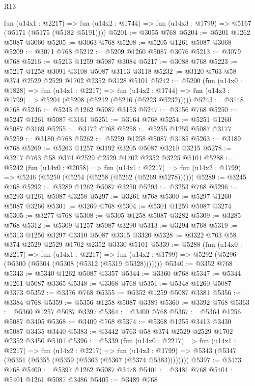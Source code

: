 \begin{lexlean}{R13}
\begin{coremodule}
    fun (u14x1 : @2217) =>
    fun (u14x2 : @1744) => fun (u14x3 : @1799) => @5167 (@5171 (@5175 (@5182 @5191))))
@5201 := @3055 @768
@5204 := @5201 @1262 @5087 @3060
@5205 := @3063 @768
@5208 := @5205 @1261 @5087 @3068
@5209 := @3071 @768
@5212 := @5209 @1260 @5087 @3076
@5213 := @3079 @768
@5216 := @5213 @1259 @5087 @3084
@5217 := @3088 @768
@5223 := @5217 @1258 @3091 @3108 @5087 @3113 @3118
@5232 := @3120 @763 @58 @374 @2529 @2529 @1702 @2352 @3128 @5101
@5242 := @5200
    (fun (u14x0 : @1828) =>
    fun (u14x1 : @2217) =>
    fun (u14x2 : @1744) => fun (u14x3 : @1799) => @5204 (@5208 (@5212 (@5216 (@5223 @5232)))))
@5243 := @3148 @768
@5246 := @5243 @1262 @5087 @3153
@5247 := @3156 @768
@5250 := @5247 @1261 @5087 @3161
@5251 := @3164 @768
@5254 := @5251 @1260 @5087 @3169
@5255 := @3172 @768
@5258 := @5255 @1259 @5087 @3177
@5259 := @3180 @768
@5262 := @5259 @1258 @5087 @3185
@5263 := @3189 @768
@5269 := @5263 @1257 @3192 @3205 @5087 @3210 @3215
@5278 := @3217 @763 @58 @374 @2529 @2529 @1702 @2352 @3225 @5101
@5288 := @5242
    (fun (u14x0 : @2058) =>
    fun (u14x1 : @2217) =>
    fun (u14x2 : @1799) => @5246 (@5250 (@5254 (@5258 (@5262 (@5269 @5278))))))
@5289 := @3245 @768
@5292 := @5289 @1262 @5087 @3250
@5293 := @3253 @768
@5296 := @5293 @1261 @5087 @3258
@5297 := @3261 @768
@5300 := @5297 @1260 @5087 @3266
@5301 := @3269 @768
@5304 := @5301 @1259 @5087 @3274
@5305 := @3277 @768
@5308 := @5305 @1258 @5087 @3282
@5309 := @3285 @768
@5312 := @5309 @1257 @5087 @3290
@5313 := @3294 @768
@5319 := @5313 @1256 @3297 @3310 @5087 @3315 @3320
@5328 := @3322 @763 @58 @374 @2529 @2529 @1702 @2352 @3330 @5101
@5339 := @5288
    (fun (u14x0 : @2217) =>
    fun (u14x1 : @2217) =>
    fun (u14x2 : @1799) => @5292 (@5296 (@5300 (@5304 (@5308 (@5312 (@5319 @5328)))))))
@5340 := @3352 @768
@5343 := @5340 @1262 @5087 @3357
@5344 := @3360 @768
@5347 := @5344 @1261 @5087 @3365
@5348 := @3368 @768
@5351 := @5348 @1260 @5087 @3373
@5352 := @3376 @768
@5355 := @5352 @1259 @5087 @3381
@5356 := @3384 @768
@5359 := @5356 @1258 @5087 @3389
@5360 := @3392 @768
@5363 := @5360 @1257 @5087 @3397
@5364 := @3400 @768
@5367 := @5364 @1256 @5087 @3405
@5368 := @3409 @768
@5374 := @5368 @1255 @3413 @3430 @5087 @3435 @3440
@5383 := @3442 @763 @58 @374 @2529 @2529 @1702 @2352 @3450 @5101
@5396 := @5339
    (fun (u14x0 : @2217) =>
    fun (u14x1 : @2217) =>
    fun (u14x2 : @2217) =>
    fun (u14x3 : @1799) => @5343 (@5347 (@5351 (@5355 (@5359 (@5363 (@5367 (@5374 @5383))))))))
@5397 := @3473 @768
@5400 := @5397 @1262 @5087 @3478
@5401 := @3481 @768
@5404 := @5401 @1261 @5087 @3486
@5405 := @3489 @768

\end{coremodule}
\end{lexlean}

